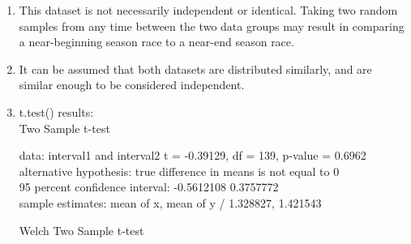 \documentclass{article}
\begin{document}
\begin{enumerate}
\begin{multicols}{2}
\begin{tabular}{lr|}
                  interval2    & 1.421543
              \end{tabular}
              \\ \\
              Going by the given means, we can see that each interval is approximately the inverse of the \# of safety car deployments per half (i.e: interval \(\approx \frac{1}{\# of deployments}\)). This makes sense as the exponential distribution (time between deployments) is the distribution of the time between events, and the Poisson distribution (number of deployments within a timespan), are inversely related.
          \end{multicols}
    \item This dataset is not necessarily independent or identical. Taking two random samples from any time between the two data groups may result in comparing a near-beginning season race to a near-end season race.
    \item It can be assumed that both datasets are distributed similarly, and are similar enough to be considered independent.
    \item t.test() results:\\
          Two Sample t-test

          data:  interval1 and interval2
          t = -0.39129, df = 139, p-value = 0.6962 \\
          alternative hypothesis: true difference in means is not equal to 0 \\
          95 percent confidence interval:
          -0.5612108  0.3757772 \\
          sample estimates:
          mean of x, mean of y /
          1.328827, 1.421543


          Welch Two Sample t-test


\end{enumerate}
\end{document}
